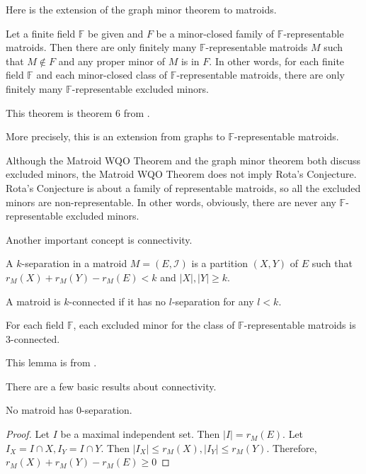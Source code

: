 Here is the extension of the graph minor theorem to matroids.

\begin{thm} 
Let a finite field $\mathbb{F}$ be given and $F$ be a minor-closed family of $\mathbb{F}$-representable matroids.
Then there are only finitely many $\mathbb{F}$-representable matroids $M$ such that $M \notin F$ and any proper minor of $M$ is in $F$.
In other words, for each finite field $\mathbb{F}$ and each minor-closed class of $\mathbb{F}$-representable matroids, there are only finitely many $\mathbb{F}$-representable excluded minors.
\end{thm}

This theorem is theorem 6 from \cite{solving}.

More precisely, this is an extension from graphs to $\mathbb{F}$-representable matroids.

Although the Matroid WQO Theorem and the graph minor theorem both discuss excluded minors, the Matroid WQO Theorem does not imply Rota's Conjecture.
Rota's Conjecture is about a family of representable matroids, so all the excluded minors are non-representable.
In other words, obviously, there are never any $\mathbb{F}$-representable excluded minors.

%

Another important concept is connectivity.
\begin{defn}
A $k$-separation in a matroid $M = (E, \mathcal{I})$ is a partition $(X, Y)$ of $E$ such that $r_M(X) + r_M(Y) - r_M(E) < k$ and $\lvert X \rvert, \lvert Y \rvert \geq k$.
\end{defn}
\begin{defn}
A matroid is $k$-connected if it has no $l$-separation for any $l < k$.
\end{defn}

\begin{lem}
For each field $\mathbb{F}$, each excluded minor for the class of $\mathbb{F}$-representable matroids is 3-connected.
\end{lem}

This lemma is from \cite{solving}.

There are a few basic results about connectivity.

\begin{thm}
No matroid has 0-separation.
\end{thm}
\begin{proof}
Let $I$ be a maximal independent set.
Then $\lvert I \rvert = r_M(E)$.
Let $I_X = I \cap X, I_Y = I \cap Y$.
Then $\lvert I_X \rvert \leq r_M(X), \lvert I_Y \rvert \leq r_M(Y)$.
Therefore, $r_M(X) + r_M(Y) - r_M(E) \geq 0$
\end{proof}


